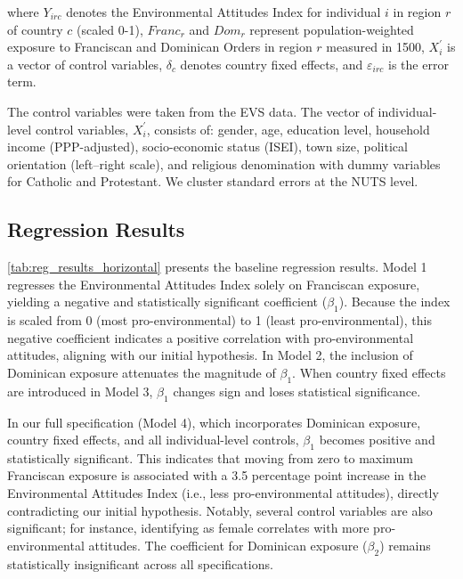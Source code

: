 \documentclass[12pt, a4paper]{article}
\begin{document}
where $Y_{irc}$ denotes the Environmental Attitudes Index for individual $i$ in region $r$ 
of country $c$ (scaled 0-1), $Franc_{r}$ and $Dom_{r}$ represent population-weighted exposure to 
Franciscan and Dominican Orders in region $r$ measured in 1500, $X_i^{\prime}$ is a vector of control
variables, $\delta_c$ denotes country fixed effects, and $\varepsilon_{irc}$ is the error term.

The control variables were taken from the EVS data. 
The vector of individual-level control variables, $X_i^{\prime}$, consists of: gender, age, education level, 
household income (PPP-adjusted), socio-economic status (ISEI), town size, political orientation 
(left–right scale), and religious denomination with dummy variables for Catholic and Protestant. 
We cluster standard errors at the NUTS level.

\FloatBarrier

\FloatBarrier
\subsection{Regression Results}

\autoref{tab:reg_results_horizontal} presents the baseline regression results. Model 1 regresses the Environmental Attitudes Index solely on Franciscan exposure, yielding a negative and statistically significant coefficient ($\beta_1$). 
Because the index is scaled from 0 (most pro-environmental) to 1 (least pro-environmental), this negative coefficient indicates a positive correlation with pro-environmental attitudes, aligning with our initial hypothesis. 
In Model 2, the inclusion of Dominican exposure attenuates the magnitude of $\beta_1$. When country fixed effects are introduced in Model 3, $\beta_1$ changes sign and loses statistical significance. 

In our full specification (Model 4), which incorporates Dominican exposure, country fixed effects, and all individual-level controls, $\beta_1$ becomes positive and statistically significant. 
This indicates that moving from zero to maximum Franciscan exposure is associated with a 3.5 percentage point increase in the Environmental Attitudes Index (i.e., less pro-environmental attitudes), directly contradicting our initial hypothesis. 
Notably, several control variables are also significant; for instance, identifying as female correlates with more pro-environmental attitudes. 
The coefficient for Dominican exposure ($\beta_2$) remains statistically insignificant across all specifications.
\end{document}
